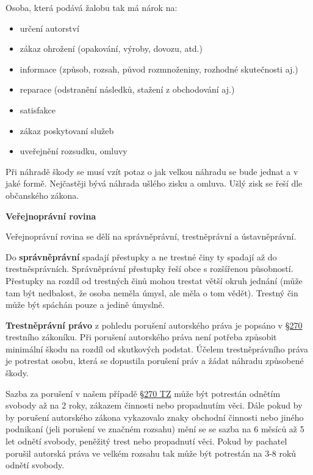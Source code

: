 Osoba, která podává žalobu tak má nárok na:
\begin{itemize}[noitemsep]
    \item určení autorství
    \item zákaz ohrožení (opakování, výroby, dovozu, atd.)
    \item informace (způsob, rozsah, původ rozmnoženiny, rozhodné skutečnosti aj.)
    \item reparace (odstranění následků, stažení z obchodování aj.)
    \item satisfakce 
    \item zákaz poskytovaní služeb
    \item uveřejnění rozsudku, omluvy
\end{itemize}

Při náhradě škody se musí vzít potaz o jak velkou náhradu se bude jednat a v jaké formě. Nejčastěji bývá náhrada ušlého zisku a omluva. Ušlý zisk se řeší dle občanského zákona.


\vspace{0,5cm}
\begin{Large}
\textbf{Veřejnoprávní rovina}
\end{Large}

Veřejnoprávní rovina se dělí na správněprávní, trestněprávní a ústavněprávní. 

Do \textbf{správněprávní} spadají přestupky a ne trestné činy ty spadají až do trestněsprávních. Správněprávní přestupky řeší obce s rozšířenou působností. Přestupky na rozdíl od trestných činů mohou trestat větší okruh jednání (může tam být nedbalost, že osoba neměla úmysl, ale měla o tom vědět). Trestný čin může být spáchán pouze a jedině úmyslně.

\textbf{Trestněprávní právo} z pohledu porušení autorského práva je popsáno v \href{https://www.zakonyprolidi.cz/cs/2009-40#p270}{§270} trestního zákoníku. Při porušení autorského práva není potřeba způsobit minimální škodu na rozdíl od skutkových podstat. Účelem trestněprávního práva je potrestat osobu, která se dopustila porušení práv a žádat náhradu způsobené škody. 

Sazba za porušení v našem případě \href{https://www.zakonyprolidi.cz/cs/2009-40#p270}{§270 TZ} může být potrestán odnětím svobody až na 2 roky, zákazem činnosti nebo propadnutím věci. Dále pokud by by porušení autorského zákona vykazovalo znaky obchodní činnosti nebo jiného podnikaní (jeli porušení ve značném rozsahu) mění se se sazba na 6 měsíců až 5 let odnětí svobody, peněžitý trest nebo propadnutí věci. Pokud by pachatel porušil autorská práva ve velkém rozsahu tak může být potrestán na 3-8 roků odnětí svobody.


